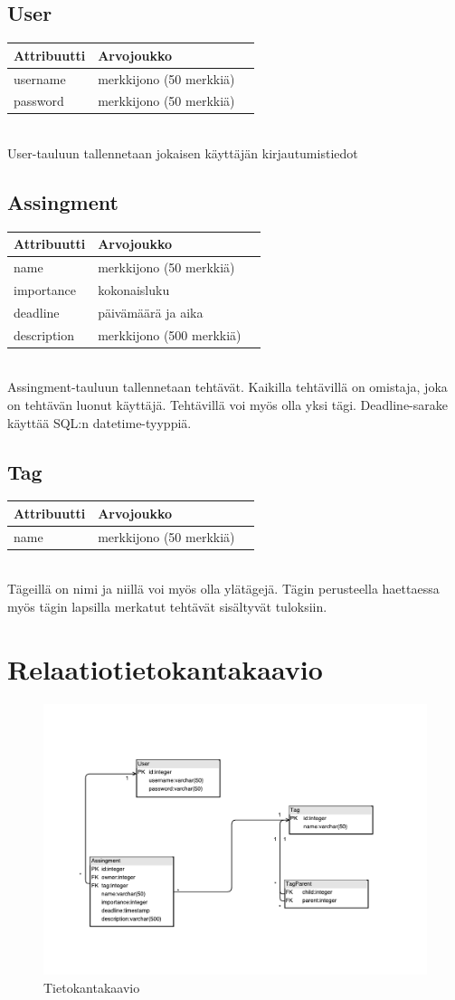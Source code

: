 \documentclass[a4paper, 12pt, finnish]{article}
\begin{document}
\subsection{User}
\begin{tabular}{l | l | l}
  Attribuutti & Arvojoukko \\ \hline
  username & merkkijono (50 merkkiä) \\ \hline
  password & merkkijono (50 merkkiä) \\
\end{tabular}
\\
User-tauluun tallennetaan jokaisen käyttäjän kirjautumistiedot

\subsection{Assingment}
\begin{tabular}{l | l | l}
  Attribuutti & Arvojoukko \\ \hline
  name & merkkijono (50 merkkiä) \\ \hline
  importance & kokonaisluku \\ \hline
  deadline & päivämäärä ja aika \\ \hline
  description & merkkijono (500 merkkiä) \\
\end{tabular}
\\
Assingment-tauluun tallennetaan tehtävät. Kaikilla tehtävillä on omistaja, joka
on tehtävän luonut käyttäjä. Tehtävillä voi myös olla yksi tägi.
Deadline-sarake käyttää SQL:n datetime-tyyppiä.

\subsection{Tag}
\begin{tabular}{l | l | l}
  Attribuutti & Arvojoukko \\ \hline
  name & merkkijono (50 merkkiä) \\
\end{tabular}
\\
Tägeillä on nimi ja niillä voi myös olla ylätägejä. Tägin perusteella haettaessa
myös tägin lapsilla merkatut tehtävät sisältyvät tuloksiin.

\section{Relaatiotietokantakaavio}

\begin{figure}[h]
  \caption{Tietokantakaavio}
  \centering
  \includegraphics[scale=0.7]{tietokantakaavio}
\end{figure}
\end{document}
